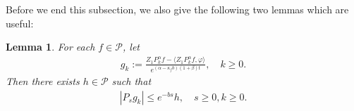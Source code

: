 \documentclass[12pt,a4paper]{amsart}
\theoremstyle{plain}
\newtheorem{lem}[thm]{Lemma}
\newtheorem{prop}[thm]{Proposition}
\theoremstyle{definition}
\numberwithin{equation}{section}
\begin{document}
    Before we end this subsection, we also give the following two lemmas which are useful:
\begin{lem}{\cite[Lemma 2.8]{MarksMilos2018CLT}}\label{lem: control of gk}
    For each $f\in \mathcal{P}$, let
\begin{align}
    g_k
    := \frac{Z_1 P^{\alpha}_k f-\langle  Z_1P^{\alpha}_k f,\varphi\rangle}{e^{(\alpha-\kappa_f b)(1+\beta)t}},
    \quad k \geq 0.
\end{align}
    Then there exists $h\in \mathcal{P}$ such that
\begin{align}
    |P_sg_k|\leq e^{-bs}h,\quad s\geq 0, k \geq 0.
\end{align}
\end{lem}
\end{document}

